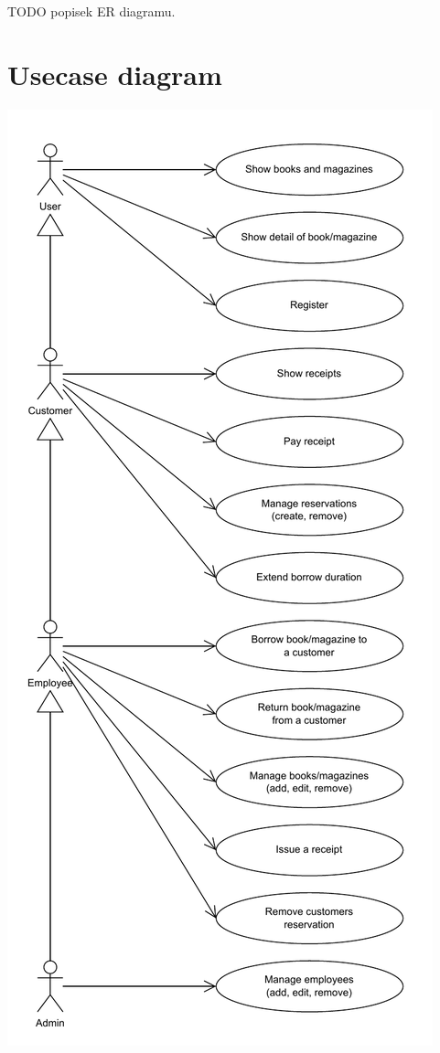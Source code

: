 \documentclass{article}
\begin{document}
TODO popisek ER diagramu.

\newpage

\section*{Usecase diagram}

\begin{center}
    \includegraphics*[height=0.95\textheight]{assets/usecase.pdf}
\end{center}
\end{document}
